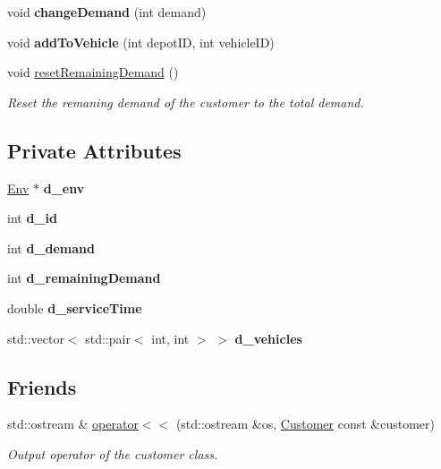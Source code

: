 \begin{DoxyCompactItemize}
void {\bfseries change\+Demand} (int demand)
\item 
\mbox{\label{class_customer_ace23d6d0c410c70f38bc99ac383201b5}} 
void {\bfseries add\+To\+Vehicle} (int depot\+ID, int vehicle\+ID)
\item 
\mbox{\label{class_customer_a0f06bdce903a3efcffe01008183b19bc}} 
void \hyperlink{class_customer_a0f06bdce903a3efcffe01008183b19bc}{reset\+Remaining\+Demand} ()
\begin{DoxyCompactList}\small\item\em Reset the remaning demand of the customer to the total demand. \end{DoxyCompactList}\end{DoxyCompactItemize}
\subsection*{Private Attributes}
\begin{DoxyCompactItemize}
\item 
\mbox{\label{class_customer_a3bab068704f4b100581f694b1b5d498e}} 
\hyperlink{class_env}{Env} $\ast$ {\bfseries d\+\_\+env}
\item 
\mbox{\label{class_customer_aec19536bdd04638512d821cd699481e1}} 
int {\bfseries d\+\_\+id}
\item 
\mbox{\label{class_customer_aa3772ede1c8e9222fa0c4aca8c06b06c}} 
int {\bfseries d\+\_\+demand}
\item 
\mbox{\label{class_customer_a24e8165587de656159a3fdd3eaa680ad}} 
int {\bfseries d\+\_\+remaining\+Demand}
\item 
\mbox{\label{class_customer_aa220a35dae020652125de1099cc8e178}} 
double {\bfseries d\+\_\+service\+Time}
\item 
\mbox{\label{class_customer_a51f0603ebcf0712f223b34d66eae0f0c}} 
std\+::vector$<$ std\+::pair$<$ int, int $>$ $>$ {\bfseries d\+\_\+vehicles}
\end{DoxyCompactItemize}
\subsection*{Friends}
\begin{DoxyCompactItemize}
\item 
std\+::ostream \& \hyperlink{class_customer_a3d7eef7f15d078958c6bbd64019e20fa}{operator$<$$<$} (std\+::ostream \&os, \hyperlink{class_customer}{Customer} const \&customer)
\begin{DoxyCompactList}\small\item\em Output operator of the customer class. \end{DoxyCompactList}\end{DoxyCompactItemize}



